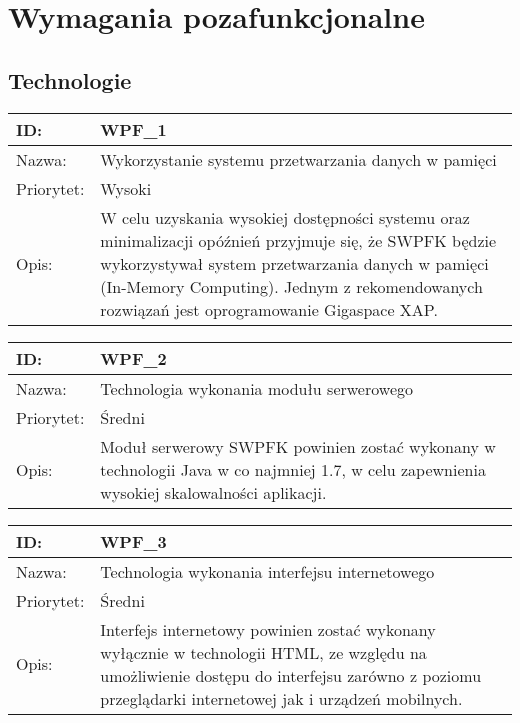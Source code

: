 \section{Wymagania pozafunkcjonalne}

\subsection{Technologie}
\begin{center}
\begin{tabular}[h]{|p{1.6cm}|p{13.5cm}|}
\hline
ID: & WPF\_1 \\ \hline
Nazwa: & Wykorzystanie systemu przetwarzania danych w pamięci \\ \hline
Priorytet: & Wysoki \\ \hline
Opis: & W celu uzyskania wysokiej dostępności systemu oraz minimalizacji opóźnień przyjmuje się, że SWPFK będzie wykorzystywał system przetwarzania danych w pamięci (In-Memory Computing). Jednym z rekomendowanych rozwiązań jest oprogramowanie Gigaspace XAP. \\
\hline
\end{tabular}
\end{center}

\begin{center}
\begin{tabular}[h]{|p{1.6cm}|p{13.5cm}|}
\hline
ID: & WPF\_2 \\ \hline
Nazwa: & Technologia wykonania modułu serwerowego \\ \hline
Priorytet: & Średni \\ \hline
Opis: & Moduł serwerowy SWPFK powinien zostać wykonany w technologii Java w co najmniej 1.7, w celu zapewnienia wysokiej skalowalności aplikacji. \\
\hline
\end{tabular}
\end{center}

\begin{center}
\begin{tabular}[h]{|p{1.6cm}|p{13.5cm}|}
\hline
ID: & WPF\_3 \\ \hline
Nazwa: & Technologia wykonania interfejsu internetowego \\ \hline
Priorytet: & Średni \\ \hline
Opis: & Interfejs internetowy powinien zostać wykonany wyłącznie w technologii HTML, ze względu na umożliwienie dostępu do interfejsu zarówno z poziomu przeglądarki internetowej jak i urządzeń mobilnych. \\
\hline
\end{tabular}
\end{center}


